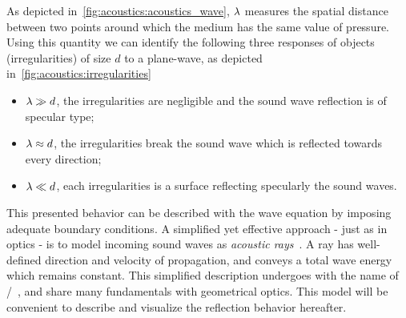 As depicted in~\cref{fig:acoustics:acoustics_wave}, $\lambda$ measures the spatial distance between two points around which the medium has the same value of pressure.
\\Using this quantity we can identify the following three responses of objects (irregularities) of size $d$ to a plane-wave, as depicted in~\cref{fig:acoustics:irregularities}
\begin{itemize}
    \item $\lambda \gg d$, the irregularities are negligible and the sound wave reflection is of specular type;
    \item $\lambda \approx d$, the irregularities break the sound wave which is reflected towards every direction;
    \item $\lambda \ll d$, each irregularities is a surface reflecting specularly the sound waves.
\end{itemize}

\begin{figure}[h]
    \footnotesize
    \resizebox{\linewidth}{!}{
        
    }
    \vspace{-\baselineskip}\vspace{-\baselineskip}
\end{figure}

\mynewline
This presented behavior can be described with the wave equation by imposing adequate boundary conditions.
A simplified yet effective approach - just as in optics - is to model incoming sound waves as \textit{acoustic rays}~.
A ray has well-defined direction and velocity of propagation, and conveys a total wave energy which remains constant.
This simplified description undergoes with the name of \GAdef/~, and share many fundamentals with geometrical optics.
This model will be convenient to describe and visualize the reflection behavior hereafter.

